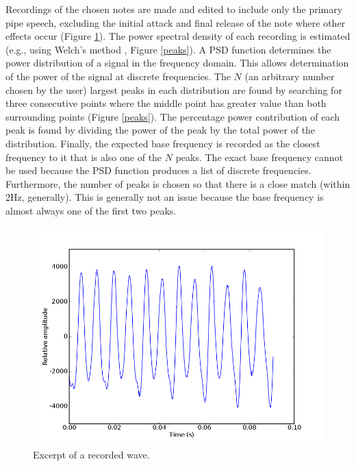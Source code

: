 \documentclass[twocolumn]{article}
\begin{document}
Recordings of the chosen notes are made and edited to include only the primary pipe speech, excluding the initial attack and final release of the note where other effects occur (Figure \ref{time}). The power spectral density of each recording is estimated (e.g., using Welch's method \cite{welch-psd}, Figure \ref{peaks}). A PSD function determines the power distribution of a signal in the frequency domain. This allows determination of the power of the signal at discrete frequencies. The $N$ (an arbitrary number chosen by the user) largest peaks in each distribution are found by searching for three consecutive points where the middle point has greater value than both surrounding points (Figure \ref{peaks}). The percentage power contribution of each peak is found by dividing the power of the peak by the total power of the distribution. Finally, the expected base frequency is recorded as the closest frequency to it that is also one of the $N$ peaks. The exact base frequency cannot be used because the PSD function produces a list of discrete frequencies. Furthermore, the number of peaks is chosen so that there is a close match (within 2Hz, generally). This is generally not an issue because the base frequency is almost always one of the first two peaks.

\begin{figure}
\centering
\includegraphics[width=\linewidth]{figures/recording-time.png}
\caption{Excerpt of a recorded wave.}
\label{time}
\end{figure}
\end{document}
